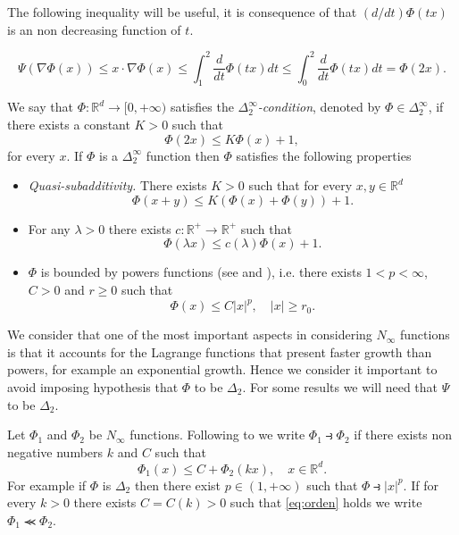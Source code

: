 \documentclass[twoside]{article}
\theoremstyle{remark}
\newcommand{\rr}{\mathbb{R}}
\renewcommand{\leq}{\leqslant}
\renewcommand{\geq}{\geqslant}
\newcounter{example}[section]
\begin{document}
The following inequality  will be useful, it is consequence of that $(d/dt)\Phi(tx)$ is an non decreasing function of $t$. 


\begin{equation}\label{eq:ine-psi-phi'}\Psi(\nabla \Phi (x))\leq  x\cdot \nabla\Phi(x) \leq\int_1^2 \frac{d}{dt}\Phi(tx)dt \leq\int_0^2\frac{d}{dt}\Phi(tx)dt=\Phi(2x).
\end{equation}

We say that  $\Phi:\mathbb{R}^d\rightarrow [0,+\infty)$ satisfies the  \emph{$\Delta_2^{\infty}$-condition}, denoted by $\Phi \in \Delta_2^{\infty}$,
if there exists a  constant $K>0$  such that
\begin{equation}\label{delta2defi}\Phi(2x)\leq K \Phi(x)+1,
\end{equation}
for every $x$.  
If $\Phi$ is a $\Delta_2^{\infty}$ function then $\Phi$ satisfies the following properties



\begin{itemize}
 \item \emph{Quasi-subadditivity.} There exists $K>0$ such that for every $x,y\in \rr^d$
\begin{equation}\label{eq:quasi-sub-aditividad}
\Phi(x+y)\leq K (\Phi(x)+\Phi(y))+1.
\end{equation}
\item  For any $\lambda>0$ there exists $c:\rr^+\to \rr^+$ such that
\begin{equation}\label{eq:delta2-lambda}
\Phi(\lambda x)\leq c(\lambda)\Phi(x)+1.
\end{equation}
\item $\Phi$ is bounded by powers functions (see \cite[Proof Lemma 2.4]{Desch2001} and \cite[Prop. 1]{cianchi2000local}), i.e. there exists $1<p<\infty$, $C>0$ and $r\geq 0$ such that
\[\Phi(x)\leq C|x|^p,\quad |x|\geq r_0.\]

\end{itemize}

We consider that one of the most important aspects in considering $N_{\infty}$ functions is that it accounts for the Lagrange functions that present faster growth than powers, for example an exponential growth. Hence we consider it important to avoid imposing hypothesis that $\Phi$ to be $\Delta_2$. For some results we will need that $\Psi$ to be $\Delta_2$. 


Let $\Phi_1$ and $\Phi_2$ be   $N_{\infty}$ functions. Following to \cite{trudinger1974imbedding} we write $\Phi_1\strictif\Phi_2$ if there exists non negative numbers $k$ and $C$ such that
\begin{equation}\label{eq:orden} \Phi_1(x)\leq C+\Phi_2(kx),\quad x\in\rr^d.\end{equation}
For example if $\Phi$ is $\Delta_2$ then there exist $p\in (1,+\infty)$ such that $\Phi\strictif |x|^p$.  If for every $k>0$ there exists $C=C(k)>0$ such that \eqref{eq:orden} holds we write  $\Phi_1\llcurly\Phi_2$. 
\end{document}

